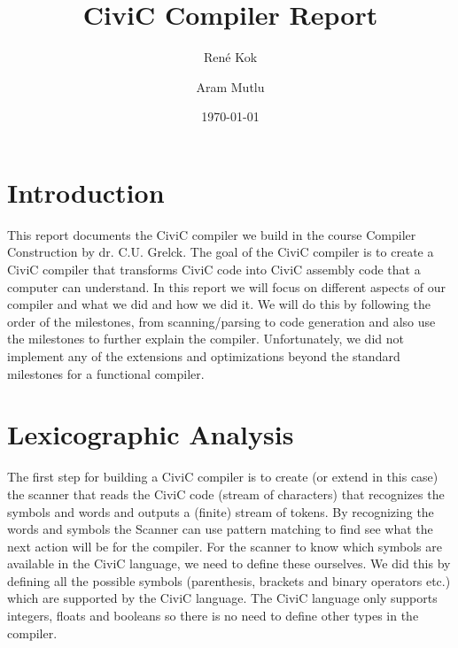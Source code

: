 \documentclass[hidelinks]{uva-inf-article}
\title{CiviC Compiler Report}
\author{René Kok}
\author{Aram Mutlu}
\date{\today}
\begin{document}
\maketitle
\newpage


\tableofcontents
\begin{abstract}
\end{abstract}
\newpage

\section{Introduction}
\par This report documents the CiviC compiler we build in 
the course Compiler Construction by dr. C.U. Grelck. The goal of the CiviC compiler 
is to create a CiviC compiler that transforms CiviC code into CiviC assembly code 
that a computer can understand. In this report we will focus on different aspects 
of our compiler and what we did and how we did it. We will do this by following the order of the milestones,
from scanning/parsing to code generation and also use the milestones to further 
explain the compiler. Unfortunately, we did not implement any of the extensions and optimizations beyond the standard 
milestones for a functional compiler.

\newpage
\section{Lexicographic Analysis}
The first step for building a CiviC compiler is to create (or extend in this case) 
the scanner that reads the CiviC code (stream of characters) that recognizes the 
symbols and words and outputs a (finite) stream of tokens.
By recognizing the words and symbols the Scanner can use pattern matching to find see
what the next action will be for the compiler. For the scanner to know which symbols
are available in the CiviC language, we need to define these ourselves. We did this 
by defining all the possible symbols (parenthesis, brackets and binary operators etc.)
which are supported by the CiviC language. The CiviC language only supports integers,
floats and booleans so there is no need to define other types in the compiler.
\end{document}
